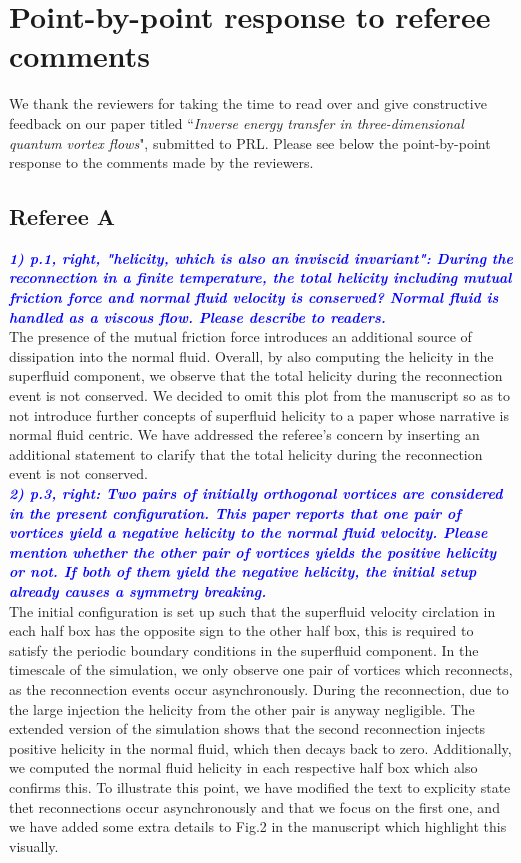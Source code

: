 \documentclass[a4paper,10pt]{article}
\def\blue#1{\textcolor{blue}{#1}}
\def\refcomment#1{\textbf{\blue{\emph{#1}}}\\}
\begin{document}
\section*{\centering Point-by-point response to referee comments}

We thank the reviewers for taking the time to read over and give constructive feedback on our paper titled “\emph{Inverse energy transfer in three-dimensional quantum vortex flows}", submitted to PRL. Please see below the point-by-point response to the comments made by the reviewers.

\subsection*{Referee A}


    \refcomment{1) p.1, right, "helicity, which is also an inviscid invariant": During
    the reconnection in a finite temperature, the total helicity including
    mutual friction force and normal fluid velocity is conserved? Normal
    fluid is handled as a viscous flow. Please describe to readers.}

    The presence of the mutual friction force introduces an additional source of dissipation into the normal fluid. Overall, by also computing the helicity in the superfluid component, we observe that the total helicity during the reconnection event is not conserved. We decided to omit this plot from the manuscript so as to not introduce further concepts of superfluid helicity to a paper whose narrative is normal fluid centric. We have addressed the referee's concern by inserting an additional statement to clarify that the total helicity during the reconnection event is not conserved. \\

    \refcomment{2) p.3, right: Two pairs of initially orthogonal vortices are
    considered in the present configuration. This paper reports that one
    pair of vortices yield a negative helicity to the normal fluid
    velocity. Please mention whether the other pair of vortices yields the
    positive helicity or not. If both of them yield the negative helicity,
    the initial setup already causes a symmetry breaking.}

    The initial configuration is set up such that the superfluid velocity circlation in each half box has the opposite sign to the other half box, this is required to satisfy the periodic boundary conditions in the superfluid component. In the timescale of the simulation, we only observe one pair of vortices which reconnects, as the reconnection events occur asynchronously. During the reconnection, due to the large injection the helicity from the other pair is anyway negligible. The extended version of the simulation shows that the second reconnection injects positive helicity in the normal fluid, which then decays back to zero. Additionally, we computed the normal fluid helicity in each respective half box which also confirms this. To illustrate this point, we have modified the text to explicity state thet reconnections occur asynchronously and that we focus on the first one, and we have added some extra details to Fig.2 in the manuscript which highlight this visually. \\
\end{document}
